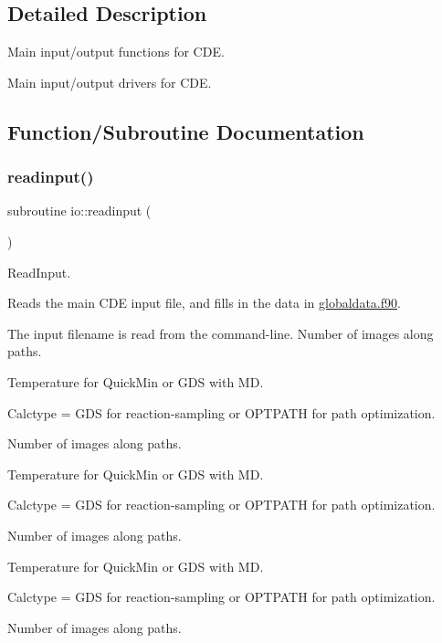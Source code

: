\subsection{Detailed Description}
Main input/output functions for C\+DE. 

Main input/output drivers for C\+DE. 

\subsection{Function/\+Subroutine Documentation}
\mbox{\label{namespaceio_aee45b0da5539969779855687cc9efd6d}} 
\subsubsection{\texorpdfstring{readinput()}{readinput()}}
{\footnotesize\ttfamily subroutine io\+::readinput (\begin{DoxyParamCaption}{ }\end{DoxyParamCaption})}



Read\+Input. 

Reads the main C\+DE input file, and fills in the data in \mbox{\hyperlink{globaldata_8f90_source}{globaldata.\+f90}}.

The input filename is read from the command-\/line. Number of images along paths.

Temperature for Quick\+Min or G\+DS with MD.

Calctype = \textquotesingle{}G\+DS\textquotesingle{} for reaction-\/sampling or \textquotesingle{}O\+P\+T\+P\+A\+TH\textquotesingle{} for path optimization.

Number of images along paths.

Temperature for Quick\+Min or G\+DS with MD.

Calctype = \textquotesingle{}G\+DS\textquotesingle{} for reaction-\/sampling or \textquotesingle{}O\+P\+T\+P\+A\+TH\textquotesingle{} for path optimization.

Number of images along paths.

Temperature for Quick\+Min or G\+DS with MD.

Calctype = \textquotesingle{}G\+DS\textquotesingle{} for reaction-\/sampling or \textquotesingle{}O\+P\+T\+P\+A\+TH\textquotesingle{} for path optimization.

Number of images along paths.

